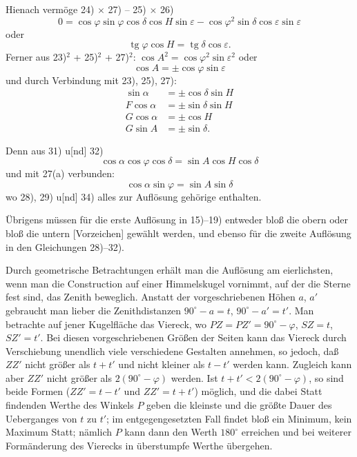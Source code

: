 \documentclass[12pt,a4paper]{article}
\theoremstyle{plain}
\theoremstyle{definition}
\theoremstyle{remark}
\DeclareMathOperator{\tg}{tg}
\begin{document}
Hienach verm\"oge 24) $\times$ 27) -- 25) $\times$ 26)
\[
0 = \cos\varphi \sin\varphi \cos\delta \cos H \sin\varepsilon - \cos\varphi^2 \sin\delta \cos\varepsilon \sin\varepsilon
\]
oder
\begin{equation}
\tg\varphi \cos H = \tg\delta \cos\varepsilon.
\end{equation}
Ferner aus 23)$^2$ + 25)$^2$ + 27)$^2$: $\cos A^2 = \cos\varphi^2 \sin\varepsilon^2$ oder
\begin{equation}
\cos A = \pm\cos\varphi \sin\varepsilon
\end{equation}
und durch Verbindung mit 23), 25), 27):
\begin{align}
\sin\alpha &= \pm\cos\delta \sin H \\
F\cos\alpha &= \pm\sin\delta \sin H \\
G\cos\alpha &= \pm\cos H \\
G\sin A &= \pm\sin\delta.
\end{align}

Denn aus 31) u[nd] 32)
\begin{equation}
\cos\alpha \cos\varphi \cos\delta = \sin A \cos H \cos\delta
\end{equation}
und mit 27(a) verbunden:
\begin{equation}
\cos\alpha \sin\varphi = \sin A \sin\delta
\end{equation}
wo 28), 29) u[nd] 34) alles zur Aufl\"osung geh\"orige enthalten.

\"Ubrigens m\"ussen f\"ur die erste Aufl\"osung in 15)--19) entweder blo\ss{} die obern oder blo\ss{} die untern [Vorzeichen] gew\"ahlt werden, und ebenso f\"ur die zweite Aufl\"osung in den Gleichungen 28)--32).

Durch geometrische Betrachtungen erh\"alt man die Aufl\"osung am eierlichsten, wenn man die Construction auf einer Himmelskugel vornimmt, auf der die Sterne fest sind, das Zenith beweglich. Anstatt der vorgeschriebenen H\"ohen $a$, $a'$ gebraucht man lieber die Zenithdistanzen $90^{\circ} - a = t$, $90^{\circ} - a' = t'$. Man betrachte auf jener Kugelfl\"ache das Viereck, wo $PZ = PZ' = 90^{\circ} - \varphi$, $SZ = t$, $SZ' = t'$. Bei diesen vorgeschriebenen Gr\"o\ss en der Seiten kann das Viereck durch Verschiebung unendlich viele verschiedene Gestalten annehmen, so jedoch, da\ss{} $ZZ'$ nicht gr\"o\ss er als $t+t'$ und nicht kleiner als $t-t'$ werden kann. Zugleich kann aber $ZZ'$ nicht gr\"o\ss er als $2(90^{\circ} - \varphi)$ werden. Ist $t + t' < 2(90^{\circ} - \varphi)$, so sind beide Formen ($ZZ' = t-t'$ und $ZZ' = t+t'$) m\"oglich, und die dabei Statt findenden Werthe des Winkels $P$ geben die kleinste und die gr\"o\ss te Dauer des Ueberganges von $t$ zu $t'$; im entgegengesetzten Fall findet blo\ss{} ein Minimum, kein Maximum Statt; n\"amlich $P$ kann dann den Werth $180^{\circ}$ erreichen und bei weiterer Form\"anderung des Vierecks in \"uberstumpfe Werthe \"ubergehen.
\end{document}

